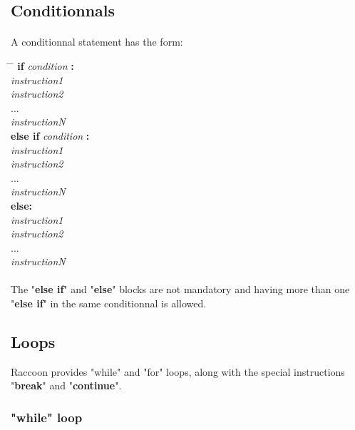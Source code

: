 \documentclass[12pt,a4paper]{article}
\begin{document}
\subsection{Conditionnals}

\paragraph{}
A conditionnal statement has the form:

\begin{tabbing}
\hspace{5cm} \= \hspace{1cm} \= \kill
   \> \textbf{if} \textit{condition} \textbf{:}  \\  
   \> \> \textit{instruction1} \\
   \> \> \textit{instruction2} \\
   \> \> ... \\
   \> \> \textit{instructionN} \\
   \> \textbf{else if} \textit{condition} \textbf{:} \\
   \> \> \textit{instruction1} \\
   \> \> \textit{instruction2} \\
   \> \> ... \\
   \> \> \textit{instructionN} \\
   \> \textbf{else:} \\
   \> \> \textit{instruction1} \\
   \> \> \textit{instruction2} \\
   \> \> ... \\
   \> \> \textit{instructionN} \\
\end{tabbing}

\paragraph{}
The "\textbf{else if}" and "\textbf{else}" blocks are not mandatory and having more than one "\textbf{else if}" in the same conditionnal is allowed.

\subsection{Loops}

Raccoon provides "while" and "for" loops, along with the special instructions "\textbf{break}" and "\textbf{continue}".

\subsubsection{"while" loop}
\end{document}
